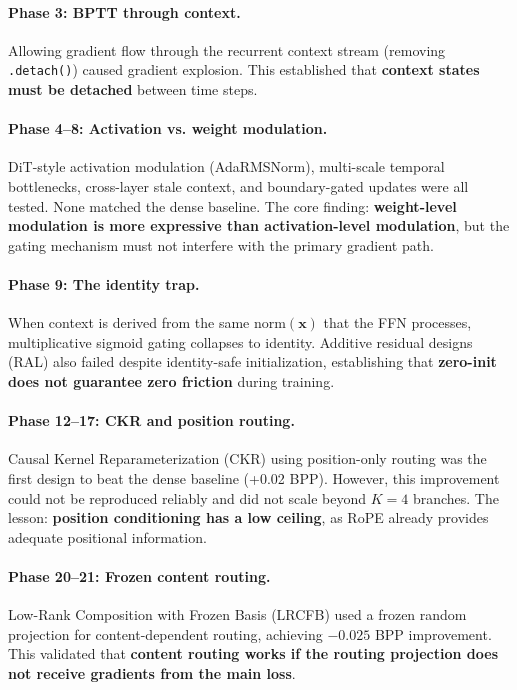 \documentclass[11pt]{article}
\begin{document}
\paragraph{Phase 3: BPTT through context.}
Allowing gradient flow through the recurrent context stream (removing \texttt{.detach()}) caused gradient explosion. This established that \textbf{context states must be detached} between time steps.

\paragraph{Phase 4--8: Activation vs. weight modulation.}
DiT-style activation modulation (AdaRMSNorm), multi-scale temporal bottlenecks, cross-layer stale context, and boundary-gated updates were all tested. None matched the dense baseline. The core finding: \textbf{weight-level modulation is more expressive than activation-level modulation}, but the gating mechanism must not interfere with the primary gradient path.

\paragraph{Phase 9: The identity trap.}
When context is derived from the same $\text{norm}(\mathbf{x})$ that the FFN processes, multiplicative sigmoid gating collapses to identity. Additive residual designs (RAL) also failed despite identity-safe initialization, establishing that \textbf{zero-init does not guarantee zero friction} during training.

\paragraph{Phase 12--17: CKR and position routing.}
Causal Kernel Reparameterization (CKR) using position-only routing was the first design to beat the dense baseline (+0.02 BPP). However, this improvement could not be reproduced reliably and did not scale beyond $K{=}4$ branches. The lesson: \textbf{position conditioning has a low ceiling}, as RoPE already provides adequate positional information.

\paragraph{Phase 20--21: Frozen content routing.}
Low-Rank Composition with Frozen Basis (LRCFB) used a frozen random projection for content-dependent routing, achieving $-0.025$ BPP improvement. This validated that \textbf{content routing works if the routing projection does not receive gradients from the main loss}.
\end{document}
